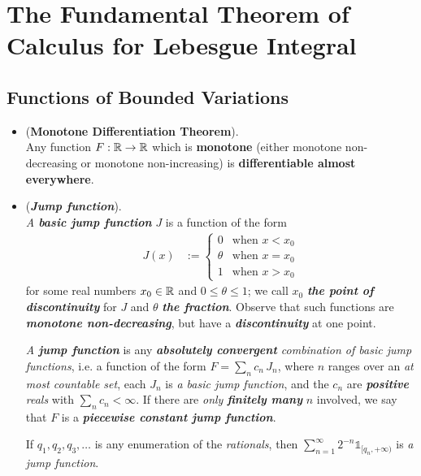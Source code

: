 \documentclass[11pt]{article}
\begin{document}
\section{The Fundamental Theorem of Calculus for Lebesgue Integral}
\subsection{Functions of Bounded Variations}
\begin{itemize}
\item \begin{theorem} (\textbf{Monotone Differentiation Theorem}). \citep{tao2011introduction} \\
Any function $F : {\mathbb R} \rightarrow {\mathbb R}$ which is \textbf{monotone} (either monotone non-decreasing or monotone non-increasing) is \textbf{differentiable almost everywhere}.
\end{theorem}

\item \begin{definition} (\textbf{\emph{Jump function}}). \citep{tao2011introduction}\\
\emph{A \textbf{basic jump function}} $J$ is a function of the form
\begin{align*}
J(x) &:= \left\{
\begin{array}{cc}
0 &\text{when }x < x_0 \\
\theta &\text{when }x = x_0 \\
1 &\text{when }x > x_0
\end{array}
\right.
\end{align*}
for some real numbers $x_0 \in {\mathbb R}$ and $0 \le \theta \le 1$; we call $x_0$ \emph{\textbf{the point of discontinuity}} for $J$ and $\theta$ \emph{\textbf{the fraction}}. Observe that such functions are \emph{\textbf{monotone non-decreasing}}, but have a \emph{\textbf{discontinuity}} at one point.

\emph{A \textbf{jump function}} is any \emph{\textbf{absolutely convergent} combination of basic jump functions}, i.e. a function of the form $F = \sum_{n}c_n\,J_n$, where $n$ ranges over an \emph{at most countable set}, each $J_n$ is \emph{a basic jump function}, and the $c_n$ are \emph{\textbf{positive} reals} with $\sum_n c_n < \infty$. If there are \emph{only \textbf{finitely many}} $n$ involved, we say that $F$ is a \emph{\textbf{piecewise constant jump function}}.
\end{definition}

\begin{example}
If $q_1, q_2, q_3, \ldots$ is any enumeration of the \emph{rationals}, then $\sum_{n=1}^{\infty} 2^{-n}\mathds{1}_{[q_n,+\infty)}$ is \emph{a jump function}.
\end{example}



\end{itemize}
\end{document}
